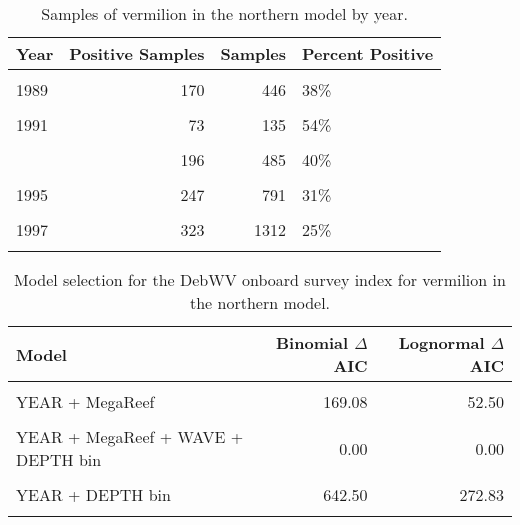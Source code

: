 \documentclass[
]{article}
\begin{document}
\begin{table}

\caption{\label{tab:tab-year-debwv}Samples of vermilion in the northern model by year.}
\centering
\begin{tabular}[t]{lrrl}
\toprule
Year & Positive Samples & Samples & Percent Positive\\
\midrule
\cellcolor{gray!6}{1988} & \cellcolor{gray!6}{136} & \cellcolor{gray!6}{422} & \cellcolor{gray!6}{32\%}\\
1989 & 170 & 446 & 38\%\\
\cellcolor{gray!6}{1990} & \cellcolor{gray!6}{65} & \cellcolor{gray!6}{122} & \cellcolor{gray!6}{53\%}\\
1991 & 73 & 135 & 54\%\\
\cellcolor{gray!6}{1992} & \cellcolor{gray!6}{168} & \cellcolor{gray!6}{467} & \cellcolor{gray!6}{36\%}\\
\addlinespace
1993 & 196 & 485 & 40\%\\
\cellcolor{gray!6}{1994} & \cellcolor{gray!6}{189} & \cellcolor{gray!6}{555} & \cellcolor{gray!6}{34\%}\\
1995 & 247 & 791 & 31\%\\
\cellcolor{gray!6}{1996} & \cellcolor{gray!6}{238} & \cellcolor{gray!6}{963} & \cellcolor{gray!6}{25\%}\\
1997 & 323 & 1312 & 25\%\\
\addlinespace
\cellcolor{gray!6}{1998} & \cellcolor{gray!6}{211} & \cellcolor{gray!6}{899} & \cellcolor{gray!6}{23\%}\\
\bottomrule
\end{tabular}
\end{table}

\FloatBarrier

\begin{table}

\caption{\label{tab:tab-model-select-debwv}Model selection for the DebWV onboard survey index for vermilion in the northern model.}
\centering
\begin{tabular}[t]{lrr}
\toprule
Model & Binomial $\Delta$AIC & Lognormal $\Delta$AIC\\
\midrule
\cellcolor{gray!6}{1} & \cellcolor{gray!6}{1011.38} & \cellcolor{gray!6}{422.42}\\
YEAR + MegaReef & 169.08 & 52.50\\
\cellcolor{gray!6}{YEAR + MegaReef + WAVE} & \cellcolor{gray!6}{120.32} & \cellcolor{gray!6}{42.13}\\
YEAR + MegaReef + WAVE + DEPTH bin & 0.00 & 0.00\\
\cellcolor{gray!6}{YEAR + WAVE + DEPTH bin} & \cellcolor{gray!6}{611.73} & \cellcolor{gray!6}{260.44}\\
\addlinespace
YEAR + DEPTH bin & 642.50 & 272.83\\
\cellcolor{gray!6}{YEAR + MegaReef + DEPTH bin} & \cellcolor{gray!6}{55.30} & \cellcolor{gray!6}{7.28}\\
\bottomrule
\end{tabular}
\end{table}
\end{document}
